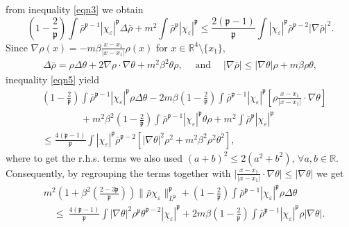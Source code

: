\documentclass{article}
\newcommand{\tmop}[1]{\ensuremath{\operatorname{#1}}}
\begin{document}
%
from inequality \eqref{eqn3} we obtain
%
\begin{equation} \label{eqn5}
    \left( 1 - \frac{2}{\mathfrak{p}} \right) \int \bar{\rho}^{\mathfrak{p}-
    1} | \chi_{\varepsilon} |^{\mathfrak{p}} \Delta \bar{\rho} + m^2 \int
    \bar{\rho}^{\mathfrak{p}} | \chi_{\varepsilon} |^{\mathfrak{p}}
    \leqslant \frac{2 (\mathfrak{p}- 1)}{\mathfrak{p}} \int |
    \chi_{\varepsilon} |^{\mathfrak{p}}  \bar{\rho}^{\mathfrak{p}- 2} |
    \nabla \bar{\rho} |^2 .
\end{equation}
%
Since $\nabla \rho (x) = - m \beta \frac{x - x_1}{| x - x_1 |} \rho (x)$ for
$x \in \mathbb{R}^4 \setminus \{ x_1 \}$,
\[ \begin{array}{l}
     \Delta \bar{\rho} = \rho \Delta \theta + 2 \nabla \rho \cdot \nabla
     \theta + m^2 \beta^2 \theta \rho, \quad \tmop{and} \quad  | \nabla
     \bar{\rho} | \leqslant | \nabla \theta | \rho + m \beta \rho \theta,
   \end{array} \]
 inequality \eqref{eqn5} yield
%
\begin{align}
    & \left( 1 - \frac{2}{\mathfrak{p}} \right)  \int \bar{\rho}^{\mathfrak{p}-
    1} | \chi_{\varepsilon} |^{\mathfrak{p}} \rho \Delta \theta   -2m \beta \left( 1 - \frac{2}{\mathfrak{p}} \right) \int \bar{\rho}^{\mathfrak{p}-
    1} | \chi_{\varepsilon} |^{\mathfrak{p}} \left[\rho \frac{x - x_1}{| x - x_1 |}  \cdot \nabla
     \theta  \right] \\
     & \qquad \qquad + m^2 \beta^2 \left( 1 - \frac{2}{\mathfrak{p}} \right) \int \bar{\rho}^{\mathfrak{p}-
    1} | \chi_{\varepsilon} |^{\mathfrak{p}}  \theta \rho + m^2 \int
    \bar{\rho}^{\mathfrak{p}} | \chi_{\varepsilon} |^{\mathfrak{p}} \nonumber\\
    & \leq \frac{4 (\mathfrak{p}- 1)}{\mathfrak{p}} \int |
    \chi_{\varepsilon} |^{\mathfrak{p}}  \bar{\rho}^{\mathfrak{p}- 2} \left[| \nabla \theta |^2 \rho^2 + m^2 \beta^2 \rho^2 \theta^2 \right],  
\end{align}
%
where to get the r.h.s. terms we also used $(a+b)^2 \leq 2(a^2 + b^2)$, $\forall a,b \in \mathbb{R}$. Consequently, by regrouping the terms together with $\bigg\vert \frac{x - x_1}{| x - x_1 |}  \cdot \nabla\theta \bigg\vert \leq |\nabla \theta|$ we get
%
\begin{align}\label{eqn6}
    & m^2 \left( 1 + \beta^2 \left( \frac{2 - 3\mathfrak{p}}{\mathfrak{p}}
    \right) \right) \| \bar{\rho}  \chi_{\varepsilon}
    \|_{L^{\mathfrak{p}}}^{\mathfrak{p}} + \left( 1 - \frac{2}{\mathfrak{p}}
    \right) \int \bar{\rho}^{\mathfrak{p}- 1} | \chi_{\varepsilon}
    |^{\mathfrak{p}} \rho \Delta \theta \nonumber\\
    & \quad \leq  ~ \frac{4 (\mathfrak{p}- 1)}{\mathfrak{p}} \int | \nabla \theta
    |^2 \rho^{\mathfrak{p}} \theta^{\mathfrak{p}- 2}  | \chi_{\varepsilon}
    |^{\mathfrak{p}} + 2 m \beta \left( 1 - \frac{2}{\mathfrak{p}} \right)
    \int \bar{\rho}^{\mathfrak{p}- 1} | \chi_{\varepsilon} |^{\mathfrak{p}}
    \rho | \nabla \theta | .
\end{align}
\end{document}
